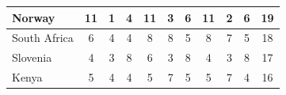 \documentclass[12pt]{article}  %
\begin{document}
\begin{subappendices}
\begin{longtable}{|l|c|c|c|c|c|c|c|c|c|c|}
	\hline
	Norway                                                         & 11                                                                     & 1                                                                      & 4                                                                      & 11                                                                     & 3                                                                      & 6                                                                      & 11                        & 2                           & 6                           & 19                          \\ 
	\hline
	South Africa                                                   & 6                                                                      & 4                                                                      & 4                                                                      & 8                                                                      & 8                                                                      & 5                                                                      & 8                         & 7                           & 5                           & 18                          \\ 
	\hline
	Slovenia                                                       & 4                                                                      & 3                                                                      & 8                                                                      & 6                                                                      & 3                                                                      & 8                                                                      & 4                         & 3                           & 8                           & 17                          \\ 
	\hline
	Kenya                                                          & 5                                                                      & 4                                                                      & 4                                                                      & 5                                                                      & 7                                                                      & 5                                                                      & 5                         & 7                           & 4                           & 16                          \\ 

\end{longtable}
\end{subappendices}
\end{document}
